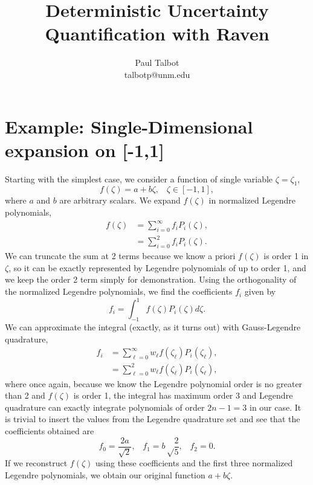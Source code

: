 \documentclass[11pt]{article} %
\title{Deterministic Uncertainty Quantification with Raven}
\author{\LARGE{Paul Talbot}\\\normalsize{ talbotp@unm.edu}}
\newcommand{\into}{\ensuremath{\int_{-1}^1}}
\begin{document}


\section{Example: Single-Dimensional expansion on [-1,1]}
Starting with the simplest case, we consider a function of single variable $\zeta=\zeta_1$,
\begin{equation}
f(\zeta)=a+b\zeta, \hspace{10pt}\zeta\in[-1,1],
\end{equation}
where $a$ and $b$ are arbitrary scalars.  We expand $f(\zeta)$ in normalized Legendre polynomials,
\begin{align}
f(\zeta)&=\sum_{i=0}^\infty f_iP_i(\zeta),\\
 &= \sum_{i=0}^2 f_iP_i(\zeta).
\end{align}
We can truncate the sum at 2 terms because we know a priori $f(\zeta)$ is order 1 in $\zeta$, so it can be exactly represented by Legendre polynomials of up to order 1, and we keep the order 2 term simply for demonstration.  Using the orthogonality of the normalized Legendre polynomials, we find the coefficients $f_i$ given by
\begin{equation}
f_i=\into f(\zeta)P_i(\zeta)d\zeta.
\end{equation}
We can approximate the integral (exactly, as it turns out) with  Gauss-Legendre quadrature,
\begin{align}
f_i&=\sum_{\ell=0}^\infty w_\ell f(\zeta_\ell)P_i(\zeta_\ell),\\
 &=\sum_{\ell=0}^2 w_\ell f(\zeta_\ell)P_i(\zeta_\ell),
\end{align}
where once again, because we know the Legendre polynomial order is no greater than 2 and $f(\zeta)$ is order 1, the integral has maximum order 3 and Legendre quadrature can exactly integrate polynomials of order $2n-1=3$ in our case.  It is trivial to insert the values from the Legendre quadrature set and see that the coefficients obtained are
\begin{equation}
f_0=\frac{2a}{\sqrt{2}},\hspace{10pt} f_1=b\sqrt\frac{2}{5},\hspace{10pt} f_2=0.
\end{equation}
If we reconstruct $f(\zeta)$ using these coefficients and the first three normalized Legendre polynomials, we obtain our original function $a+b\zeta$.
\end{document}
